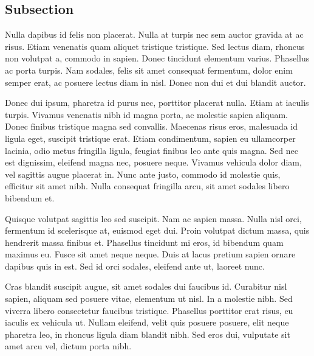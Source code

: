 \documentclass[../a5report_tablet.tex]{subfiles}
\begin{document}
\subsection{Subsection}
Nulla dapibus id felis non placerat. Nulla at turpis nec sem auctor gravida at ac risus.
Etiam venenatis quam aliquet tristique tristique. Sed lectus diam, rhoncus non volutpat a,
commodo in sapien. Donec tincidunt elementum varius. Phasellus ac porta turpis. Nam sodales,
felis sit amet consequat fermentum, dolor enim semper erat, ac posuere lectus diam in nisl.
Donec non dui et dui blandit auctor.

Donec dui ipsum, pharetra id purus nec, porttitor placerat nulla. Etiam at iaculis turpis.
Vivamus venenatis nibh id magna porta, ac molestie sapien aliquam. Donec finibus tristique magna
sed convallis. Maecenas risus eros, malesuada id ligula eget, suscipit tristique erat. Etiam
condimentum, sapien eu ullamcorper lacinia, odio metus fringilla ligula, feugiat finibus leo ante
quis magna. Sed nec est dignissim, eleifend magna nec, posuere neque. Vivamus vehicula dolor diam,
vel sagittis augue placerat in. Nunc ante justo, commodo id molestie quis, efficitur sit amet nibh.
Nulla consequat fringilla arcu, sit amet sodales libero bibendum et.

Quisque volutpat sagittis leo sed suscipit. Nam ac sapien massa. Nulla nisl orci, fermentum id
scelerisque at, euismod eget dui. Proin volutpat dictum massa, quis hendrerit massa finibus et.
Phasellus tincidunt mi eros, id bibendum quam maximus eu. Fusce sit amet neque neque. Duis at lacus
pretium sapien ornare dapibus quis in est. Sed id orci sodales, eleifend ante ut, laoreet nunc.

Cras blandit suscipit augue, sit amet sodales dui faucibus id. Curabitur nisl sapien, aliquam sed
posuere vitae, elementum ut nisl. In a molestie nibh. Sed viverra libero consectetur faucibus tristique.
Phasellus porttitor erat risus, eu iaculis ex vehicula ut. Nullam eleifend, velit quis posuere
posuere, elit neque pharetra leo, in rhoncus ligula diam blandit nibh. Sed eros dui, vulputate sit
amet arcu vel, dictum porta nibh.
\end{document}
